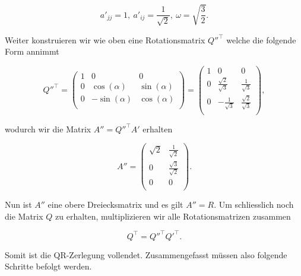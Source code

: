 \begin{equation*}
    a'_{jj} = 1, \ a'_{ij} = \frac{1}{\sqrt{2}}, \ \omega = \sqrt{\frac{3}{2}}.
\end{equation*}

Weiter konstruieren wir wie oben eine Rotationsmatrix \( Q''^\top \) welche die folgende Form annimmt

\begin{equation*}
    Q''^\top = \begin{pmatrix}
        1 & 0 & 0 \\
        0 & \cos(\alpha) & \sin(\alpha) \\
        0 & -\sin(\alpha) & \cos(\alpha) \\
    \end{pmatrix} =
    \begin{pmatrix}
        1 & 0 & 0 \\
        0 & \frac{\sqrt{2}}{\sqrt{3}} & \frac{1}{\sqrt{3}} \\
        0 & -\frac{1}{\sqrt{3}} & \frac{\sqrt{2}}{\sqrt{3}} \\
    \end{pmatrix},
\end{equation*}

wodurch wir die Matrix \( A'' = Q''^\top A' \) erhalten

\begin{equation*}
    A'' =
    \begin{pmatrix}
        \sqrt{2} & \frac{1}{\sqrt{2}} \\
        0 & \frac{\sqrt{3}}{\sqrt{2}} \\
        0 & 0 \\
    \end{pmatrix}.
\end{equation*}

Nun ist \( A'' \) eine obere Dreiecksmatrix und es gilt \( A'' = R \). Um schliesslich noch die Matrix \( Q \) zu erhalten, multiplizieren wir alle Rotationsmatrizen zusammen 

\begin{equation*}
    Q^\top = Q''^\top Q'^\top.
\end{equation*}

Somit ist die QR-Zerlegung vollendet. Zusammengefasst müssen also folgende Schritte befolgt werden. 

